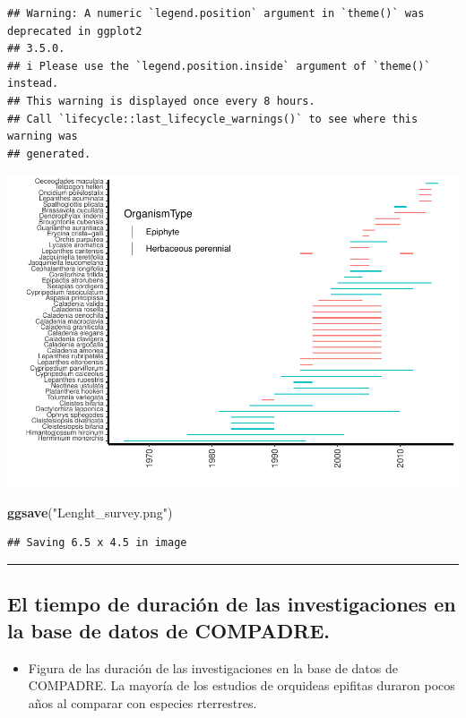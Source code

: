 \documentclass[
]{book}
\newenvironment{Shaded}{\begin{snugshade}}{\end{snugshade}}
\newcommand{\FunctionTok}[1]{\textcolor[rgb]{0.13,0.29,0.53}{\textbf{#1}}}
\newcommand{\NormalTok}[1]{#1}
\newcommand{\StringTok}[1]{\textcolor[rgb]{0.31,0.60,0.02}{#1}}
\providecommand{\tightlist}{%
  \setlength{\itemsep}{0pt}\setlength{\parskip}{0pt}}
\theoremstyle{definition}
\theoremstyle{definition}
\theoremstyle{definition}
\theoremstyle{definition}
\theoremstyle{remark}
\begin{document}
\begin{verbatim}
## Warning: A numeric `legend.position` argument in `theme()` was deprecated in ggplot2
## 3.5.0.
## i Please use the `legend.position.inside` argument of `theme()` instead.
## This warning is displayed once every 8 hours.
## Call `lifecycle::last_lifecycle_warnings()` to see where this warning was
## generated.
\end{verbatim}

\includegraphics{Diagnostico_Poblacional_files/figure-latex/chap16_13-1.pdf}

\begin{Shaded}
\begin{Highlighting}[]
\FunctionTok{ggsave}\NormalTok{(}\StringTok{"Lenght\_survey.png"}\NormalTok{)}
\end{Highlighting}
\end{Shaded}

\begin{verbatim}
## Saving 6.5 x 4.5 in image
\end{verbatim}

\begin{center}\rule{0.5\linewidth}{0.5pt}\end{center}

\subsection{El tiempo de duración de las investigaciones en la base de datos de COMPADRE.}\label{el-tiempo-de-duraciuxf3n-de-las-investigaciones-en-la-base-de-datos-de-compadre.}

\begin{itemize}
\tightlist
\item
  Figura de las duración de las investigaciones en la base de datos de COMPADRE. La mayoría de los estudios de orquideas epifitas duraron pocos años al comparar con especies rterrestres.
\end{itemize}
\end{document}
